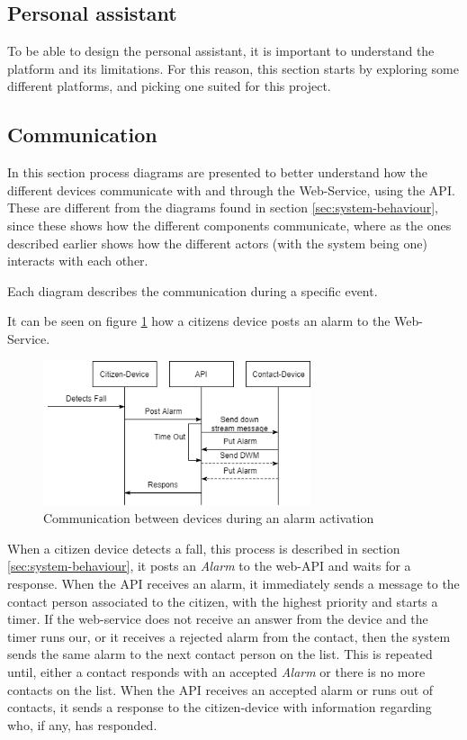 \subsection{Personal assistant}
To be able to design the personal assistant, it is important to understand the platform and its limitations. For this reason, this section starts by exploring some different platforms, and picking one suited for this project. 


\subsection{Communication}
In this section process diagrams are presented to better understand how the different devices communicate with and through the Web-Service, using the API. These are different from the diagrams found in section \ref{sec:system-behaviour}, since these shows how the different components communicate, where as the ones described earlier shows how the different actors (with the system being one) interacts with each other. 

Each diagram describes the communication during a specific event. 

It can be seen on figure \ref{fig:post-alarm} how a citizens device posts an alarm to the Web-Service.

\begin{figure}[H]
    \centering
    \includegraphics[width=0.7\textwidth]{Figures/Citizen_to_Contact.png}
    \caption{Communication between devices during an alarm activation}
    \label{fig:post-alarm}
\end{figure}

When a citizen device detects a fall, this process is described in section \ref{sec:system-behaviour}, it posts an \textit{Alarm} to the web-API and waits for a response. When the API receives an alarm, it immediately sends a message to the contact person associated to the citizen, with the highest priority and starts a timer. If the web-service does not receive an answer from the device and the timer runs our, or it receives a rejected alarm from the contact, then the system sends the same alarm to the next contact person on the list. This is repeated until, either a contact responds with an accepted \textit{Alarm} or there is no more contacts on the list. When the API receives an accepted alarm or runs out of contacts, it sends a response to the citizen-device with information regarding who, if any, has responded.

